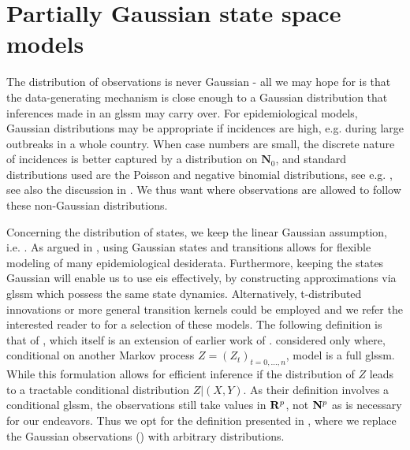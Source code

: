 \section{Partially Gaussian state space models}
\label{sec:logconcave_gaussian_state_space_models}

The distribution of observations is never Gaussian - all we may hope for is that the data-generating mechanism is close enough to a Gaussian distribution that inferences made in an \acrshort{glssm} may carry over.
For epidemiological models, Gaussian distributions may be appropriate if incidences are high, e.g. during large outbreaks in a whole country. 
When case numbers are small, the discrete nature of incidences is better captured by a distribution on $\mathbf N_{0}$, and standard distributions used are the Poisson and negative binomial distributions, see e.g. \citep{Lloyd-Smith2005Superspreadinga}, see also the discussion in . We thus want  where observations are allowed to follow these non-Gaussian distributions. 

Concerning the distribution of states, we keep the linear Gaussian assumption, i.e. . As argued in ,  using Gaussian states and transitions allows for flexible modeling of many epidemiological desiderata. Furthermore, keeping the states Gaussian will enable us to use \acrfull{eis} effectively, by constructing approximations via \acrshort{glssm} which possess the same state dynamics. Alternatively, t-distributed innovations or more general transition kernels could be employed and we refer the interested reader to \citep[Part II]{Durbin2012Time} for a selection of these models. The following definition is that of \citep{Koopman2019Modified}, which itself is an extension of earlier work of \citep{Shephard1994Partial}. \citep{Shephard1994Partial} considered only  where, conditional on another Markov process $Z = (Z_{t})_{t = 0, \dots, n}$, model is a full \acrshort{glssm}. While this formulation allows for efficient inference if the distribution of $Z$ leads to a tractable conditional distribution $Z| (X, Y)$. As their definition involves a conditional \acrshort{glssm}, the observations still take values in $\mathbf R^{p}$, not $\mathbf N^{p}$ as is necessary for our endeavors. Thus we opt for the definition presented in \citep{Koopman2019Modified}, where we replace the Gaussian observations () with arbitrary distributions.

